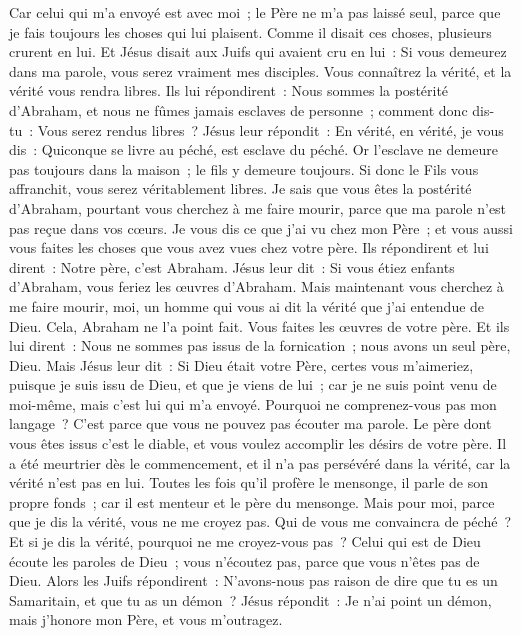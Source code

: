\begin{multicols}{2}
Car celui qui m'a envoyé est avec moi~; le Père ne m'a pas laissé seul, parce que je fais toujours les choses qui lui plaisent.
Comme il disait ces choses, plusieurs crurent en lui.
Et Jésus disait aux Juifs qui avaient cru en lui~: Si vous demeurez dans ma parole, vous serez vraiment mes disciples.
Vous connaîtrez la vérité, et la vérité vous rendra libres.
Ils lui répondirent~: Nous sommes la postérité d'Abraham, et nous ne fûmes jamais esclaves de personne~; comment donc dis-tu~: Vous serez rendus libres~?
Jésus leur répondit~: En vérité, en vérité, je vous dis~: Quiconque se livre au péché, est esclave du péché.
Or l'esclave ne demeure pas toujours dans la maison~; le fils y demeure toujours.
Si donc le Fils vous affranchit, vous serez véritablement libres.
Je sais que vous êtes la postérité d'Abraham, pourtant vous cherchez à me faire mourir, parce que ma parole n'est pas reçue dans vos cœurs.
Je vous dis ce que j'ai vu chez mon Père~; et vous aussi vous faites les choses que vous avez vues chez votre père.
Ils répondirent et lui dirent~: Notre père, c'est Abraham. Jésus leur dit~: Si vous étiez enfants d'Abraham, vous feriez les œuvres d'Abraham.
Mais maintenant vous cherchez à me faire mourir, moi, un homme qui vous ai dit la vérité que j'ai entendue de Dieu. Cela, Abraham ne l'a point fait.
Vous faites les œuvres de votre père. Et ils lui dirent~: Nous ne sommes pas issus de la fornication~; nous avons un seul père, Dieu.
Mais Jésus leur dit~: Si Dieu était votre Père, certes vous m'aimeriez, puisque je suis issu de Dieu, et que je viens de lui~; car je ne suis point venu de moi-même, mais c'est lui qui m'a envoyé.
Pourquoi ne comprenez-vous pas mon langage~? C'est parce que vous ne pouvez pas écouter ma parole.
Le père dont vous êtes issus c'est le diable, et vous voulez accomplir les désirs de votre père. Il a été meurtrier dès le commencement, et il n'a pas persévéré dans la vérité, car la vérité n'est pas en lui. Toutes les fois qu'il profère le mensonge, il parle de son propre fonds~; car il est menteur et le père du mensonge.
Mais pour moi, parce que je dis la vérité, vous ne me croyez pas.
Qui de vous me convaincra de péché~? Et si je dis la vérité, pourquoi ne me croyez-vous pas~?
Celui qui est de Dieu écoute les paroles de Dieu~; vous n'écoutez pas, parce que vous n'êtes pas de Dieu.
Alors les Juifs répondirent~: N'avons-nous pas raison de dire que tu es un Samaritain, et que tu as un démon~?
Jésus répondit~: Je n'ai point un démon, mais j'honore mon Père, et vous m'outragez.

\end{multicols}
